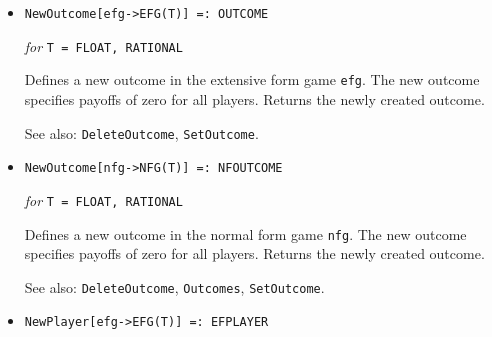 \begin{itemize}
{\it for} {\tt T = FLOAT, RATIONAL}
\bd
Creates a new normal form game with dimensionality \verb+dim+.
By default, the payoffs and probabilities associated with the game will
be stored as {\tt FLOAT}.  If the \verb+rational+ parameter is specified
and is \verb+True+, these values will be stored as {\tt RATIONAL}.
No initialization of the payoffs of the game is done.
Returns the newly created game.
\ed



\item{}
\protect \large \begin{verbatim} 
NewOutcome[efg->EFG(T)] =: OUTCOME
\end{verbatim}\normalsize

{\it for} {\tt T = FLOAT, RATIONAL} 

\bd 
Defines a new outcome in the extensive form game \verb+efg+.  The new
outcome specifies payoffs of zero for all players.  Returns the newly
created outcome.
\item [See also:] \verb+DeleteOutcome+, \verb+SetOutcome+.
\ed


\item{}
\protect \large \begin{verbatim} 
NewOutcome[nfg->NFG(T)] =: NFOUTCOME
\end{verbatim}\normalsize

{\it for} {\tt T = FLOAT, RATIONAL} 

\bd 
Defines a new outcome in the normal form game \verb+nfg+.  The new
outcome specifies payoffs of zero for all players.  Returns the newly
created outcome.
\item [See also:] \verb+DeleteOutcome+, \verb+Outcomes+,
\verb+SetOutcome+.
\ed


\item{}
\protect \large \begin{verbatim}
NewPlayer[efg->EFG(T)] =: EFPLAYER 
\end{verbatim}\normalsize


\end{itemize}
